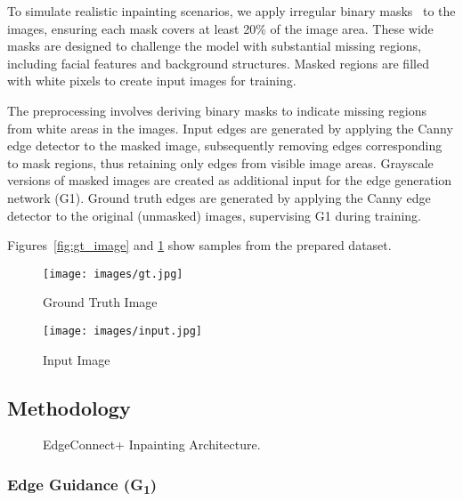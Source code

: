 To simulate realistic inpainting scenarios, we apply irregular binary masks~\cite{masks} to the images, ensuring each mask covers at least 20\% of the image area. These wide masks are designed to challenge the model with substantial missing regions, including facial features and background structures. Masked regions are filled with white pixels to create input images for training. 


The preprocessing involves deriving binary masks to indicate missing regions from white areas in the images. Input edges are generated by applying the Canny edge detector to the masked image, subsequently removing edges corresponding to mask regions, thus retaining only edges from visible image areas. Grayscale versions of masked images are created as additional input for the edge generation network (G1). Ground truth edges are generated by applying the Canny edge detector to the original (unmasked) images, supervising G1 during training.


Figures~\ref{fig:gt_image} and \ref{fig:input_image} show samples from the prepared dataset.

\begin{figure}[h!]
    \centering
    \begin{minipage}{0.22\textwidth}
        \centering
        \texttt{[image: images/gt.jpg]}
        \caption{Ground Truth Image}
        \label{fig:gt_image}
    \end{minipage}\hfill
    \begin{minipage}{0.22\textwidth}
        \centering
        \texttt{[image: images/input.jpg]}
        \caption{Input Image}
        \label{fig:input_image}
    \end{minipage}
\end{figure}



\subsection{Methodology}
\label{sec:methodology}

\begin{figure*}[t]
  \centering
  \resizebox{\textwidth}{!}{
    
  }
  \caption{EdgeConnect+ Inpainting Architecture.}
  \label{fig:pipeline}
\end{figure*}



\subsubsection{Edge Guidance (G\textsubscript{1})}

